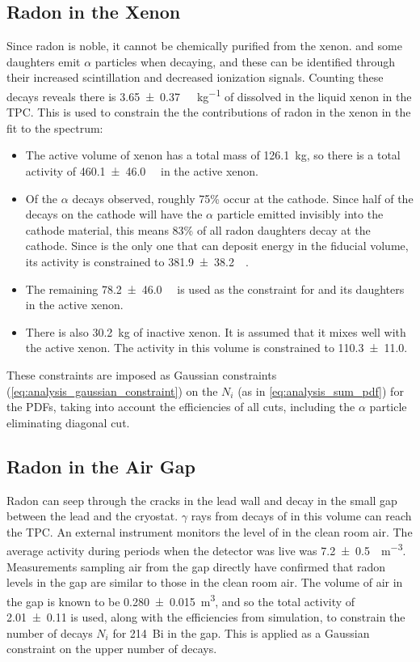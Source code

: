 \documentclass[herrin-thesis.tex]{subfiles}
\begin{document}
\subsection{Radon in the Xenon}
Since radon is noble, it cannot be chemically purified from the xenon.  and some daughters emit \(\alpha\) particles when decaying, and these can be identified through their increased scintillation and decreased ionization signals. Counting these decays reveals there is \SI{3.65\pm0.37}{\micro\Bq\per\kg} of  dissolved in the liquid xenon in the TPC. This is used to constrain the the contributions of radon in the xenon in the fit to the spectrum:
\begin{itemize}
\item The active volume of xenon has a total mass of \SI{126.1}{\kg}, so there is a total activity of \SI{460.1\pm46.0}{\micro\Bq} in the active xenon.
\item Of the  \(\alpha\) decays observed, roughly 75\% occur at the cathode. Since half of the decays on the cathode will have the \(\alpha\) particle emitted invisibly into the cathode material, this means 83\% of all radon daughters decay at the cathode. Since  is the only one that can deposit energy in the fiducial volume, its activity is constrained to \SI{381.9\pm38.2}{\micro\Bq}.
\item The remaining \SI{78.2\pm46.0}{\micro\Bq} is used as the constraint for  and its daughters in the active xenon.
\item There is also \SI{30.2}{\kg} of inactive xenon. It is assumed that it mixes well with the active xenon. The activity in this volume is constrained to \SI{110.3\pm11.0}{\Bq}.
\end{itemize}
These constraints are imposed as Gaussian constraints (\cref{eq:analysis_gaussian_constraint}) on the \(N_i\) (as in \cref{eq:analysis_sum_pdf}) for the PDFs, taking into account the efficiencies of all cuts, including the \(\alpha\) particle eliminating diagonal cut.

\subsection{Radon in the Air Gap}
Radon can seep through the cracks in the lead wall and decay in the small gap between the lead and the cryostat. \(\gamma\) rays from decays of  in this volume can reach the TPC. An external instrument \cite{rad7} monitors the level of  in the clean room air. The average activity during periods when the detector was live was \SI{7.2\pm0.5}{\Bq\per\cubic\meter}. Measurements sampling air from the gap directly have confirmed that radon levels in the gap are similar to those in the clean room air. The volume of air in the gap is known to be \SI{.280\pm0.015}{\cubic\meter}, and so the total activity of \SI{2.01\pm 0.11}{\Bq} is used, along with the efficiencies from simulation, to constrain the number of decays \(N_i\) for \SI{214}{Bi} in the gap. This is applied as a Gaussian constraint on the upper number of decays.
\end{document}
